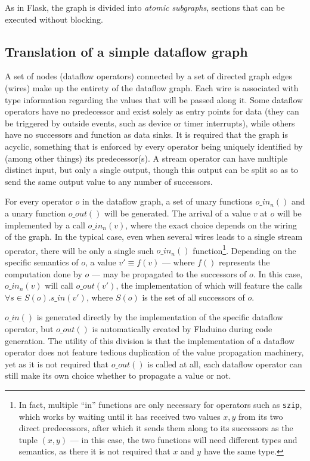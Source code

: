 \documentclass[a4paper, oneside, final]{memoir}
\begin{document}
As in Flask, the graph is divided into \textit{atomic subgraphs},
sections that can be executed without blocking.

\subsection{Translation of a simple dataflow graph}

A set of nodes (dataflow operators) connected by a set of directed
graph edges (wires) make up the entirety of the dataflow graph. Each
wire is associated with type information regarding the values that
will be passed along it.  Some dataflow operators have no predecessor
and exist solely as entry points for data (they can be triggered by
outside events, such as device or timer interrupts), while others have
no successors and function as data sinks.  It is required that the
graph is acyclic, something that is enforced by every operator being
uniquely identified by (among other things) its predecessor(s).  A
stream operator can have multiple distinct input, but only a single
output, though this output can be split so as to send the same output
value to any number of successors.

For every operator $o$ in the dataflow graph, a set of unary functions
$o\_in_n()$ and a unary function $o\_out()$ will be generated.  The
arrival of a value $v$ at $o$ will be implemented by a call
$o\_in_n(v)$, where the exact choice depends on the wiring of the
graph.  In the typical case, even when several wires leads to a single
stream operator, there will be only a single such $o\_in_n()$
function\footnote{In fact, multiple ``in'' functions are only
  necessary for operators such as \texttt{szip}, which works by
  waiting until it has received two values $x, y$ from its two direct
  predecessors, after which it sends them along to its successors as
  the tuple $(x,y)$ --- in this case, the two functions will need
  different types and semantics, as there it is not required that $x$
  and $y$ have the same type.}.  Depending on the specific semantics
of $o$, a value $v'\equiv f(v)$ --- where $f()$ represents the
computation done by $o$ --- may be propagated to the successors of $o$.
In this case, $o\_in_n(v)$ will call $o\_out(v')$, the implementation
of which will feature the calls $\forall s \in S(o). s\_in(v')$, where
$S(o)$ is the set of all successors of $o$.

$o\_in()$ is generated directly by the implementation of the specific
dataflow operator, but $o\_out()$ is automatically created by Fladuino
during code generation.  The utility of this division is that the
implementation of a dataflow operator does not feature tedious
duplication of the value propagation machinery, yet as it is not
required that $o\_out()$ is called at all, each dataflow operator can
still make its own choice whether to propagate a value or not.
\end{document}
